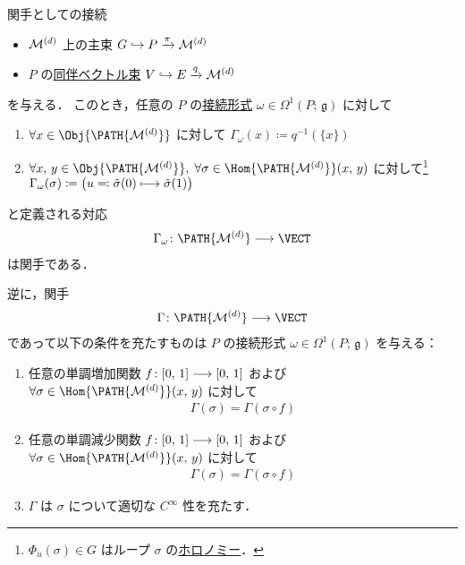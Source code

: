 \documentclass[TQFT_main]{subfiles}
\begin{document}
\begin{myprop}[label=prop:connection-functor]{関手としての接続}
    \begin{itemize}
        \item $\mathcal{M}^{(d)}$ 上の主束 $G \hookrightarrow P \xrightarrow{\pi} \mathcal{M}^{(d)}$
        \item $P$ の\hyperref[def:associated-vect]{同伴ベクトル束} $V \hookrightarrow E \xrightarrow{q} \mathcal{M}^{(d)}$
    \end{itemize}
    を与える．
    このとき，任意の $P$ の\hyperref[def:connection]{接続形式} $\omega \in \Omega^1(P;\, \mathfrak{g})$ に対して
    \begin{enumerate}
        \item $\forall x \in \Obj{\PATH{\mfdcal{M}{d}}}$ に対して $\Gamma_\omega(x) \coloneqq q^{-1}(\{x\})$
        \item $\forall x,\, y \in \Obj{\PATH{\mfdcal{M}{d}}},\; \forall \sigma \in \Hom{\PATH{\mfdcal{M}{d}}} (x,\, y)$ に対して\footnote{$\Phi_u(\sigma) \in G$ はループ $\sigma$ の\hyperref[prop:holonomy]{ホロノミー}．} $\Gamma_\omega(\sigma) \coloneqq \bigl( u \eqqcolon \tilde{\sigma}(0) \longmapsto \tilde{\sigma}(1) \bigr)$
    \end{enumerate}
    と定義される対応
    \begin{align}
        \Gamma_\omega \colon \PATH{\mfdcal{M}{d}} \lto \VECT
    \end{align}
    は関手である．

    \tcblower
    
    逆に，関手
    \begin{align}
        \Gamma \colon \PATH{\mfdcal{M}{d}} \lto \VECT
    \end{align}
    であって以下の条件を充たすものは $P$ の接続形式 $\omega \in \Omega^1(P;\, \mathfrak{g})$ を与える：
    \begin{enumerate}
        \item 任意の単調増加関数 $f \colon [0,\, 1] \longrightarrow [0,\, 1]$ および $\forall \sigma \in \Hom{\PATH{\mfdcal{M}{d}}} (x,\, y)$ に対して
        \begin{align}
            \Gamma(\sigma) = \Gamma (\sigma \circ f)
        \end{align}
        \item 任意の単調減少関数 $f \colon [0,\, 1] \longrightarrow [0,\, 1]$ および $\forall \sigma \in \Hom{\PATH{\mfdcal{M}{d}}} (x,\, y)$ に対して
        \begin{align}
            \Gamma(\sigma) = \Gamma (\sigma \circ f)
        \end{align}
        \item $\Gamma$ は $\sigma$ について適切な $C^\infty$ 性を充たす．
    \end{enumerate}
\end{myprop}
\end{document}
